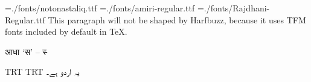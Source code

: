 \nopagenumbers
\parindent=0mm
\font\noto={./fonts/notonastaliq.ttf}
\font\amiri={./fonts/amiri-regular.ttf}
\font\raj={./fonts/Rajdhani-Regular.ttf}
This paragraph will not be shaped by Harfbuzz, because it uses TFM fonts included by default in \TeX.

\raj
आधा ‘स’ – स्‍

\textdir TRT
\pardir TRT
\noto
یہ اردو ہے۔
\bye
